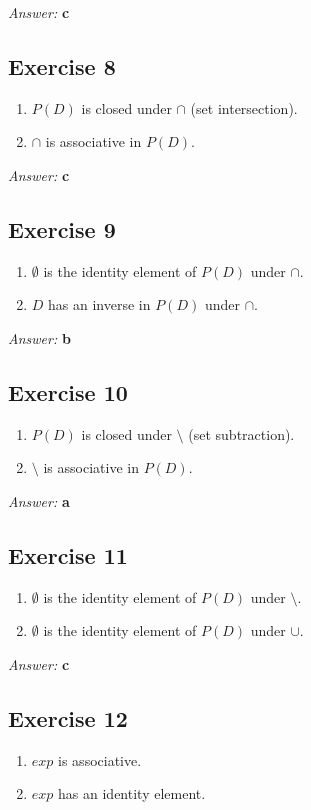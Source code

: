 \documentclass[11pt]{article}
\begin{document}
\emph{Answer:} \textbf{c}
\subsection{Exercise 8}
\label{sec-2-8}
\begin{enumerate}
\item $P(D)$ is closed under $\cap$ (set intersection).
\item $\cap$ is associative in $P(D)$.
\end{enumerate}

\emph{Answer:} \textbf{c}
\subsection{Exercise 9}
\label{sec-2-9}
\begin{enumerate}
\item $\emptyset$ is the identity element of $P(D)$ under $\cap$.
\item $D$ has an inverse in $P(D)$ under $\cap$.
\end{enumerate}

\emph{Answer:} \textbf{b}
\subsection{Exercise 10}
\label{sec-2-10}
\begin{enumerate}
\item $P(D)$ is closed under $\setminus$ (set subtraction).
\item $\setminus$ is associative in $P(D)$.
\end{enumerate}

\emph{Answer:} \textbf{a}
\subsection{Exercise 11}
\label{sec-2-11}
\begin{enumerate}
\item $\emptyset$ is the identity element of $P(D)$ under $\setminus$.
\item $\emptyset$ is the identity element of $P(D)$ under $\cup$.
\end{enumerate}

\emph{Answer:} \textbf{c}
\subsection{Exercise 12}
\label{sec-2-12}
\begin{enumerate}
\item $exp$ is associative.
\item $exp$ has an identity element.
\end{enumerate}
\end{document}

